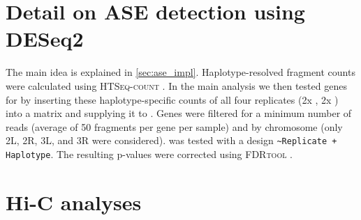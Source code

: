 \section{Detail on ASE detection using DESeq2}
\label{sec:suppl_deseq}
The main idea is explained in \cref{sec:ase_impl}. Haplotype-resolved fragment
counts were calculated using \textsc{HTSeq-count} \citep{Anders2015}.
In the main analysis we then tested genes for \ase by inserting these
haplotype-specific counts of all four replicates (2x \Nmat, 2x \Npat) into a
matrix and supplying it to \deseq. Genes were filtered for a minimum number of
reads (average of 50 fragments per gene per sample) and by chromosome (only 2L,
2R, 3L, and 3R were considered). \deseq was tested with a design
\texttt{\footnotesize \textasciitilde Replicate + Haplotype}. The resulting p-values were corrected using
\textsc{FDRtool} \citep{Strimmer2008}.





\section{Hi-C analyses}
\label{sec:suppl_hic}
